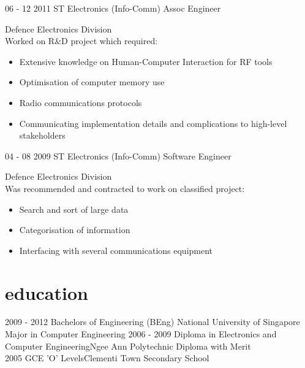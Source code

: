 \documentclass[]{friggeri-cv}
\begin{document}
\begin{entrylist}
	\entry
	{06 - 12 2011 }
	{ST Electronics (Info-Comm)}
	{Assoc Engineer}
	{Defence Electronics Division \\Worked on R\&D project which required:
	\begin{itemize}[itemsep=0pt,topsep=0pt]
	\item Extensive knowledge on Human-Computer Interaction for RF tools
	\item Optimisation of computer memory use
	\item Radio communications protocols
	\item Communicating implementation details and complications to high-level stakeholders
	\end{itemize}}
	
	\entry
	{04 - 08 2009}
	{ST Electronics (Info-Comm)}
	{Software Engineer}
	{Defence Electronics Division \\Was recommended and contracted to work on classified project:
	\begin{itemize}[itemsep=0pt,topsep=0pt]
	\item Search and sort of large data
	\item Categorisation of information
	\item Interfacing with several communications equipment
	\end{itemize}}
\end{entrylist}

\section{education}

\begin{entrylist}
	\entry
	{2009 - 2012}
	{Bachelors of Engineering (BEng)}
	{National University of Singapore}
	{
		Major in Computer Engineering
	}
	\entry
	{2006 - 2009}
	{Diploma in Electronics and Computer Engineering}{Ngee Ann Polytechnic}
	{
		Diploma with Merit\\
	}
	\entry
	{2005}
	{GCE 'O' Levels}{Clementi Town Secondary School}
	{}
\end{entrylist}
\pagebreak
\end{document}
